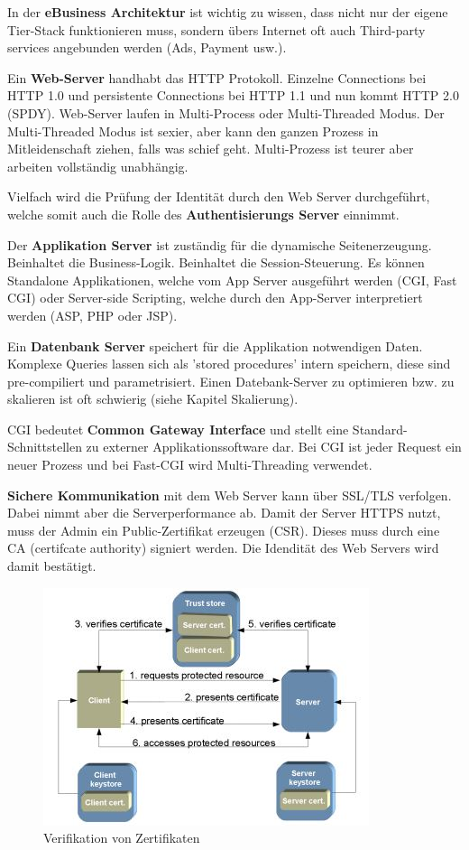 In der \textbf{eBusiness Architektur} ist wichtig zu wissen, dass nicht nur der eigene Tier-Stack funktionieren muss, sondern übers Internet oft auch Third-party services angebunden werden (Ads, Payment usw.).

Ein \textbf{Web-Server} handhabt das HTTP Protokoll. Einzelne Connections bei HTTP 1.0 und persistente Connections bei HTTP 1.1 und nun kommt HTTP 2.0 (SPDY). Web-Server laufen in Multi-Process oder Multi-Threaded Modus. Der Multi-Threaded Modus ist sexier, aber kann den ganzen Prozess in Mitleidenschaft ziehen, falls was schief geht. Multi-Prozess ist teurer aber arbeiten vollständig unabhängig.

Vielfach wird die Prüfung der Identität durch den Web Server durchgeführt, welche somit auch die Rolle des \textbf{Authentisierungs Server} einnimmt.

Der \textbf{Applikation Server} ist zuständig für die dynamische Seitenerzeugung. Beinhaltet die Business-Logik. Beinhaltet die Session-Steuerung. Es können Standalone Applikationen, welche vom App Server ausgeführt werden (CGI, Fast CGI) oder Server-side Scripting, welche durch den App-Server interpretiert werden (ASP, PHP oder JSP).

Ein \textbf{Datenbank Server} speichert für die Applikation notwendigen Daten. Komplexe Queries lassen sich als 'stored procedures' intern speichern, diese sind pre-compiliert und parametrisiert. Einen Datebank-Server zu optimieren bzw. zu skalieren ist oft schwierig (siehe Kapitel Skalierung).

CGI bedeutet \textbf{Common Gateway Interface} und stellt eine Standard-Schnittstellen zu externer Applikationssoftware dar. Bei CGI ist jeder Request ein neuer Prozess und bei Fast-CGI wird Multi-Threading verwendet.

\textbf{Sichere Kommunikation} mit dem Web Server kann über SSL/TLS verfolgen. Dabei nimmt aber die Serverperformance ab. Damit der Server HTTPS nutzt, muss der Admin ein Public-Zertifikat erzeugen (CSR). Dieses muss durch eine CA (certifcate authority) signiert werden. Die Idendität des Web Servers wird damit bestätigt. 

\begin{figure}[h!]
	\centering
	\includegraphics[width=0.7\linewidth]{fig/cms-ablauf-verifikation-von-zertifikaten}
	\caption{Verifikation von Zertifikaten}
	\label{fig:cms-ablauf-verifikation-von-zertifikaten}
\end{figure}

